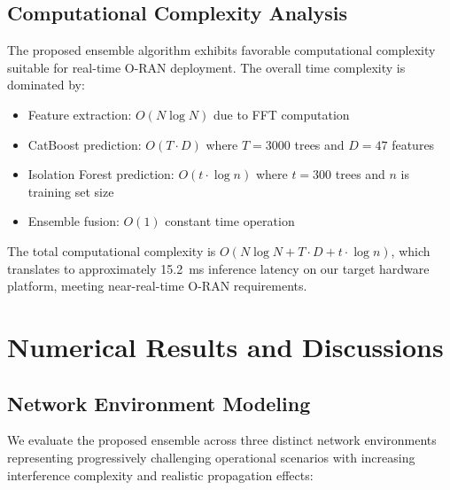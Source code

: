 \documentclass[journal]{IEEEtran}
\begin{document}
\subsection{Computational Complexity Analysis}

The proposed ensemble algorithm exhibits favorable computational complexity suitable for real-time O-RAN deployment. The overall time complexity is dominated by:

\begin{itemize}
    \item Feature extraction: $O(N \log N)$ due to FFT computation
    \item CatBoost prediction: $O(T \cdot D)$ where $T = 3000$ trees and $D = 47$ features
    \item Isolation Forest prediction: $O(t \cdot \log n)$ where $t = 300$ trees and $n$ is training set size
    \item Ensemble fusion: $O(1)$ constant time operation
\end{itemize}

The total computational complexity is $O(N \log N + T \cdot D + t \cdot \log n)$, which translates to approximately 15.2~ms inference latency on our target hardware platform, meeting near-real-time O-RAN requirements.

\section{Numerical Results and Discussions}

\subsection{Network Environment Modeling}

We evaluate the proposed ensemble across three distinct network environments representing progressively challenging operational scenarios with increasing interference complexity and realistic propagation effects:
\end{document}
